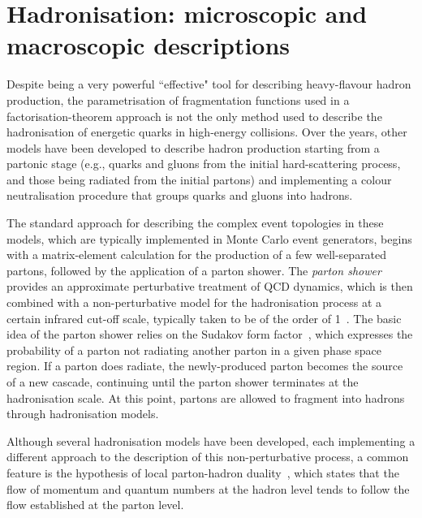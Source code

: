 \section{Hadronisation: microscopic and macroscopic descriptions}\label{sec:hadronisation}
Despite being a very powerful ``effective" tool for describing heavy-flavour hadron production, the parametrisation of fragmentation functions used in a factorisation-theorem approach is not the only method used to describe the hadronisation of energetic quarks in high-energy collisions. Over the years, other models have been developed to describe hadron production starting from a partonic stage (e.g., quarks and gluons from the initial hard-scattering process, and those being radiated from the initial partons) and implementing a colour neutralisation procedure that groups quarks and gluons into hadrons.

The standard approach for describing the complex event topologies in these models, which are typically implemented in Monte Carlo event generators, begins with a matrix-element calculation for the production of a few well-separated partons, followed by the application of a parton shower. The \emph{parton shower} provides an approximate perturbative treatment of QCD dynamics, which is then combined with a non-perturbative model for the hadronisation process at a certain infrared cut-off scale, typically taken to be of the order of 1~\gev. The basic idea of the parton shower relies on the Sudakov form factor~\cite{Sudakov:1954sw}, which expresses the probability of a parton not radiating another parton in a given phase space region. If a parton does radiate, the newly-produced parton becomes the source of a new cascade, continuing until the parton shower terminates at the hadronisation scale. At this point, partons are allowed to fragment into hadrons through hadronisation models. 

Although several hadronisation models have been developed, each implementing a different approach to the description of this non-perturbative process, a common feature is the hypothesis of local parton-hadron duality~\cite{Azimov:1984np}, which states that the flow of momentum and quantum numbers at the hadron level tends to follow the flow established at the parton level.

